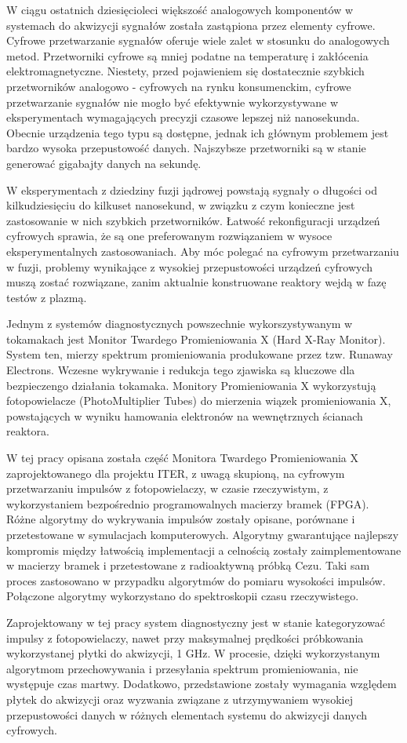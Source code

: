 W ciągu ostatnich dziesięcioleci większość analogowych komponentów
w systemach do akwizycji sygnałów została zastąpiona przez 
elementy cyfrowe. Cyfrowe przetwarzanie sygnałów oferuje
wiele zalet w stosunku do analogowych metod.
Przetworniki cyfrowe są mniej podatne na temperaturę i 
zakłócenia elektromagnetyczne.
Niestety, przed pojawieniem się dostatecznie szybkich przetworników analogowo - cyfrowych
na rynku konsumenckim, cyfrowe przetwarzanie sygnałów nie mogło być 
efektywnie wykorzystywane w eksperymentach wymagających precyzji czasowe
lepszej niż nanosekunda. 
Obecnie urządzenia tego typu są dostępne, jednak ich głównym problemem  
jest bardzo wysoka przepustowość danych. Najszybsze przetworniki
są w stanie generować gigabajty danych na sekundę.


W eksperymentach z dziedziny fuzji jądrowej powstają sygnały
o długości od kilkudziesięciu do kilkuset nanosekund, w związku
z czym konieczne jest zastosowanie w nich szybkich przetworników.
Łatwość rekonfiguracji urządzeń cyfrowych sprawia,
że są one preferowanym rozwiązaniem w wysoce eksperymentalnych
zastosowaniach. Aby móc polegać na cyfrowym przetwarzaniu
w fuzji, problemy wynikające z wysokiej przepustowości 
urządzeń cyfrowych muszą zostać rozwiązane, zanim aktualnie konstruowane
reaktory wejdą w fazę testów z plazmą.


Jednym z systemów diagnostycznych powszechnie wykorszystywanym w 
tokamakach jest Monitor Twardego Promieniowania X (Hard X-Ray Monitor).
System ten, mierzy spektrum promieniowania produkowane przez tzw. Runaway
Electrons. Wczesne wykrywanie i redukcja tego zjawiska są kluczowe
dla bezpieczengo działania tokamaka.
Monitory Promieniowania X wykorzystują fotopowielacze (PhotoMultiplier Tubes)
do mierzenia wiązek promieniowania X, powstających w wyniku hamowania
elektronów na wewnętrznych ścianach reaktora.


W tej pracy opisana została część Monitora Twardego Promieniowania X 
zaprojektowanego dla projektu ITER, z uwagą skupioną, na cyfrowym przetwarzaniu
impulsów z fotopowielaczy, w czasie rzeczywistym, z wykorzystaniem bezpośrednio
programowalnych macierzy bramek (FPGA). Różne algorytmy do wykrywania 
impulsów zostały opisane, porównane i przetestowane w symulacjach komputerowych.
Algorytmy gwarantujące najlepszy kompromis między łatwością implementacji 
a celnością zostały zaimplementowane w macierzy bramek i przetestowane 
z radioaktywną próbką Cezu. Taki sam proces zastosowano w przypadku
algorytmów do pomiaru wysokości impulsów. Połączone algorytmy wykorzystano
do spektroskopii czasu rzeczywistego.


Zaprojektowany w tej pracy system diagnostyczny jest w stanie kategoryzować 
impulsy z fotopowielaczy, nawet przy maksymalnej prędkości próbkowania 
wykorzystanej płytki do akwizycji, 1 GHz. W procesie,
dzięki wykorzystanym algorytmom przechowywania i
przesyłania spektrum promieniowania, nie występuje czas martwy.
Dodatkowo, przedstawione zostały wymagania względem płytek do akwizycji oraz wyzwania
związane z utrzymywaniem wysokiej przepustowości danych w różnych elementach systemu
do akwizycji danych cyfrowych.

